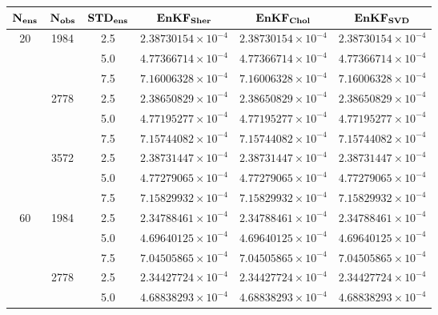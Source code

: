 \documentclass[12pt]{article}
\begin{document}
\begin{table}[H]
\centering
{\footnotesize
\begin{tabular}{|c|c|c|c|c|c|} \hline
$\bf N_{ens}$ & $\bf N_{obs}$ & $\bf STD_{ens}$ & ${\bf  EnKF_{Sher}  }$ & ${\bf EnKF_{Chol} }$ & ${\bf  EnKF_{SVD} }$ \\ \hline
\multirow{9}{*}{20} &  \multirow{3}{*}{1984}  & 2.5 & $2.38730154 \times 10^{-4}$ & $2.38730154 \times 10^{-4} $ & $ 2.38730154 \times 10^{-4} $ \\
& & 5.0 & $ 4.77366714 \times 10^{-4} $ & $ 4.77366714 \times 10^{-4} $ & $ 4.77366714 \times 10^{-4} $  \\ 
& & 7.5 & $ 7.16006328 \times 10^{-4} $ & $ 7.16006328 \times 10^{-4} $ & $ 7.16006328 \times 10^{-4} $  \\ 
\cline{2-6}
&  \multirow{3}{*}{2778}  & 2.5 & $ 2.38650829 \times 10^{-4} $ & $ 2.38650829 \times 10^{-4} $ & $ 2.38650829 \times 10^{-4} $ \\
& & 5.0 & $ 4.77195277 \times 10^{-4} $ & $ 4.77195277 \times 10^{-4} $ & $ 4.77195277 \times 10^{-4} $  \\ 
& & 7.5 & $ 7.15744082 \times 10^{-4} $ & $ 7.15744082 \times 10^{-4} $ & $ 7.15744082 \times 10^{-4} $  \\ 
\cline{2-6}
&  \multirow{3}{*}{3572}  & 2.5 & $ 2.38731447 \times 10^{-4} $ & $ 2.38731447 \times 10^{-4} $ & $ 2.38731447 \times 10^{-4} $ \\
& & 5.0 & $ 4.77279065 \times 10^{-4} $ & $ 4.77279065 \times 10^{-4} $ & $ 4.77279065 \times 10^{-4} $  \\ 
& & 7.5 & $ 7.15829932 \times 10^{-4} $ & $ 7.15829932 \times 10^{-4} $ & $ 7.15829932 \times 10^{-4} $  \\ 
\cline{1-6}
\multirow{9}{*}{60} &  \multirow{3}{*}{1984}  & 2.5 & $2.34788461 \times 10^{-4}$ & $2.34788461 \times 10^{-4} $ & $ 2.34788461 \times 10^{-4} $ \\
& & 5.0 & $ 4.69640125 \times 10^{-4} $ & $ 4.69640125 \times 10^{-4} $ & $ 4.69640125 \times 10^{-4} $  \\ 
& & 7.5 & $ 7.04505865 \times 10^{-4} $ & $ 7.04505865 \times 10^{-4} $ & $ 7.04505865 \times 10^{-4} $  \\ 
\cline{2-6}
&  \multirow{3}{*}{2778}  & 2.5 & $ 2.34427724 \times 10^{-4} $ & $ 2.34427724 \times 10^{-4} $ & $ 2.34427724 \times 10^{-4} $ \\
& & 5.0 & $ 4.68838293 \times 10^{-4} $ & $ 4.68838293 \times 10^{-4} $ & $ 4.68838293 \times 10^{-4} $  \\ 

\end{tabular}}
\end{table}
\end{document}
